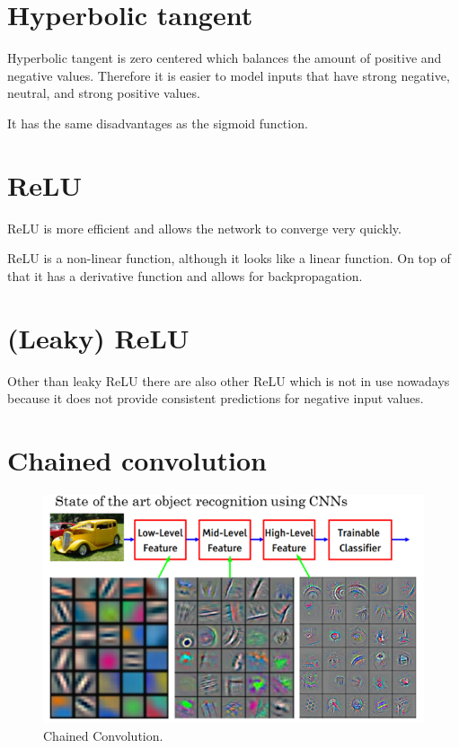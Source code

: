 \documentclass[a4paper,13pt,twoside]{book}
\begin{document}
\section{Hyperbolic tangent}

Hyperbolic tangent is zero centered which balances the amount of positive and negative values. Therefore it is easier to model inputs that have strong negative, neutral, and strong positive values.

It has the same disadvantages as the sigmoid function.

\section{ReLU}

ReLU is more efficient and allows the network to converge very quickly.

ReLU is a non-linear function, although it looks like a linear function. On top of that it has a derivative function and allows for backpropagation.

\section{(Leaky) ReLU}

Other than leaky ReLU there are also other ReLU which is not in use nowadays because it does not provide consistent predictions for negative input values.

\section{Chained convolution}

\begin{figure}[h!]
  \includegraphics[width=\linewidth]{Images/chainedconvoluion(17).png}
  \caption{Chained Convolution.}
  \label{fig:Chained Convolution}
\end{figure}
\end{document}
